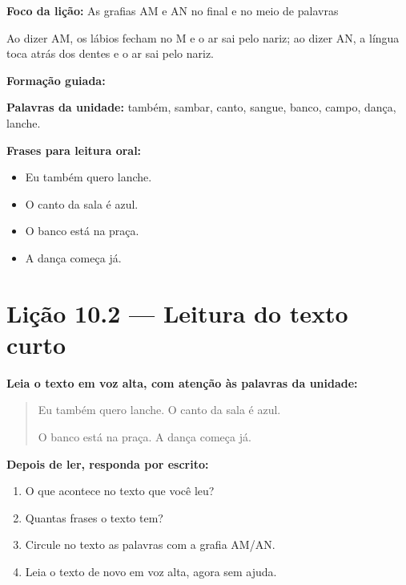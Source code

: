 \textbf{Foco da lição:} As grafias AM e AN no final e no meio de palavras


\begin{boquinha}
Ao dizer AM, os lábios fecham no M e o ar sai pelo nariz; ao dizer AN, a língua toca atrás dos dentes e o ar sai pelo nariz.
\end{boquinha}

\noindent\textbf{Formação guiada:}

\begin{center}
\end{center}

\noindent\textbf{Palavras da unidade:} também, sambar, canto, sangue, banco, campo, dança, lanche.

\noindent\textbf{Frases para leitura oral:}
\begin{itemize}[leftmargin=1.6em]
  \item Eu também quero lanche.
  \item O canto da sala é azul.
  \item O banco está na praça.
  \item A dança começa já.
\end{itemize}

\section{Lição 10.2 --- Leitura do texto curto}

\noindent\textbf{Leia o texto em voz alta, com atenção às palavras da unidade:}


\begin{quote}
Eu também quero lanche. O canto da sala é azul.

O banco está na praça. A dança começa já.
\end{quote}

\textbf{Depois de ler, responda por escrito:}
\begin{enumerate}

  \item O que acontece no texto que você leu?
  \begin{center}
  \underline{\hspace{12cm}}
  \end{center}

  \item Quantas frases o texto tem?
  \begin{center}
  \underline{\hspace{12cm}}
  \end{center}

  \item Circule no texto as palavras com a grafia AM/AN.

  \item Leia o texto de novo em voz alta, agora sem ajuda.

\end{enumerate}

